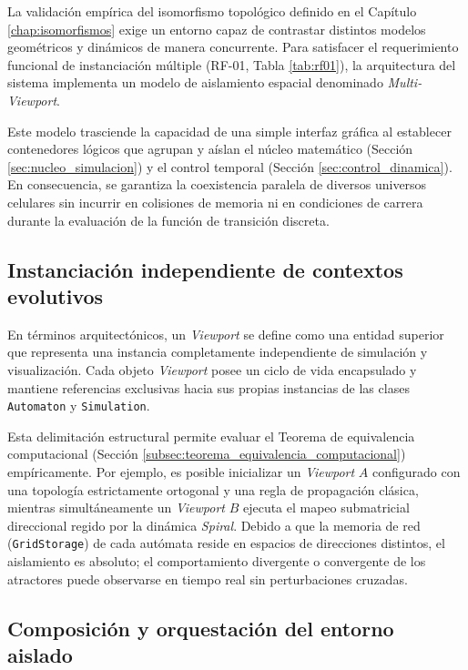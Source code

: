 La validación empírica del isomorfismo topológico definido en el Capítulo \ref{chap:isomorfismos} exige un entorno capaz de contrastar distintos modelos geométricos y dinámicos de manera concurrente. Para satisfacer el requerimiento funcional de instanciación múltiple (RF-01, Tabla \ref{tab:rf01}), la arquitectura del sistema implementa un modelo de aislamiento espacial denominado \textit{Multi-Viewport}. 

Este modelo trasciende la capacidad de una simple interfaz gráfica al establecer contenedores lógicos que agrupan y aíslan el núcleo matemático (Sección \ref{sec:nucleo_simulacion}) y el control temporal (Sección \ref{sec:control_dinamica}). En consecuencia, se garantiza la coexistencia paralela de diversos universos celulares sin incurrir en colisiones de memoria ni en condiciones de carrera durante la evaluación de la función de transición discreta.

\subsection{Instanciación independiente de contextos evolutivos}
\label{subsec:instanciacion_viewport}

En términos arquitectónicos, un \textit{Viewport} se define como una entidad superior que representa una instancia completamente independiente de simulación y visualización. Cada objeto \textit{Viewport} posee un ciclo de vida encapsulado y mantiene referencias exclusivas hacia sus propias instancias de las clases \texttt{Automaton} y \texttt{Simulation}.

Esta delimitación estructural permite evaluar el Teorema de equivalencia computacional (Sección \ref{subsec:teorema_equivalencia_computacional}) empíricamente. Por ejemplo, es posible inicializar un \textit{Viewport} $A$ configurado con una topología estrictamente ortogonal y una regla de propagación clásica, mientras simultáneamente un \textit{Viewport} $B$ ejecuta el mapeo submatricial direccional regido por la dinámica \textit{Spiral}. Debido a que la memoria de red (\texttt{GridStorage}) de cada autómata reside en espacios de direcciones distintos, el aislamiento es absoluto; el comportamiento divergente o convergente de los atractores puede observarse en tiempo real sin perturbaciones cruzadas.

\subsection{Composición y orquestación del entorno aislado}

